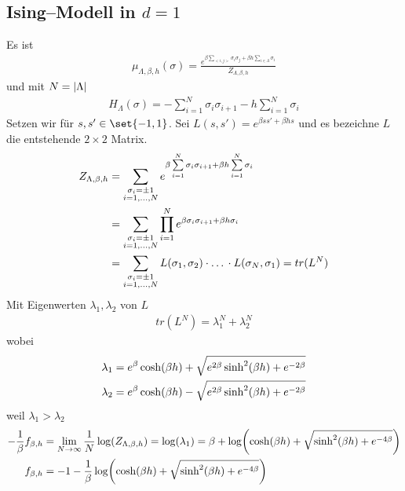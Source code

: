 \subsection*{Ising--Modell in $d=1$}
 Es ist 
 \begin{align}
 	\mu_{\Lambda, \beta, h}(\sigma) = \frac{e^{\beta \sum_{<i,j>}\sigma_i\sigma_j + \beta h \sum_{i \in \Lambda} \sigma_i  } }{Z_{\Lambda, \beta, h}}
 \end{align}
 und mit $N = \lvert\Lambda\rvert$
 \begin{align}
 	H_{\Lambda}(\sigma) = - \sum\limits_{i = 1}^{N} \sigma_i \sigma_{i+1} - h \sum\limits_{i=1}^{N} \sigma_i
 \end{align}
 Setzen wir für $s,s' \in \set{-1,1}$. Sei $L(s,s') = e^{\beta ss' + \beta h s}$ und es bezeichne $L$ die entstehende $2 \times 2$ Matrix.
 \begin{align}
 	Z_{\Lambda, \beta, h} &= \sum\limits_{\substack{\sigma_i = \pm1 \\ i = 1,\dots,N}} e^{\beta \sum\limits_{i=1}^{N} \sigma_i \sigma_{i+1} + \beta h \sum\limits_{i = 1}^{N} \sigma_i } \\
		 	&= \sum\limits_{\substack{\sigma_i = \pm1 \\ i = 1,\dots,N}} \prod\limits_{i=1}^{N} e^{\beta \sigma_i \sigma_{i+1} + \beta h \sigma_i }  \\
		 	&= \sum\limits_{\substack{\sigma_i = \pm1 \\ i = 1,\dots,N}} L(\sigma_1,\sigma_2) \cdot \text{\dots}  \cdot L(\sigma_N,\sigma_1) = tr(L^N)
 \end{align}
 Mit Eigenwerten $\lambda_1, \lambda_2$ von $L$ 
 \begin{align}
 	tr(L^N) = \lambda_1^N+\lambda_2^N
 \end{align}
 wobei
 \begin{align}
 	\lambda_1 &= e^{\beta} \cosh\enb{\beta h} + \sqrt{e^{2\beta} \sinh^2\enb{\beta h} + e^{-2\beta} } \\
 	\lambda_2 &= e^{\beta} \cosh\enb{\beta h} - \sqrt{e^{2\beta} \sinh^2\enb{\beta h} + e^{-2\beta} }
 \end{align}
 weil $\lambda_1 > \lambda_2$
 \begin{align}
 	-\frac{1}{\beta} f_{\beta,h} &= \lim\limits_{N \to \infty} \frac{1}{N} \log \enb{Z_{\Lambda,\beta,h}} = \log(\lambda_1) = \beta + \log \enb{\cosh\enb{\beta h} + \sqrt{\sinh^2\enb{\beta h} + e^{-4\beta } } } \\
 	f_{\beta,h} &= -1 - \frac{1}{\beta} \log \enb{\cosh\enb{\beta h} + \sqrt{\sinh^2\enb{\beta h} + e^{-4\beta } } }
 \end{align}

